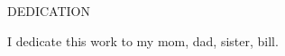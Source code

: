 \begin{center}
DEDICATION
\end{center}

I dedicate this work to my mom, dad, sister, bill.

\newpage
